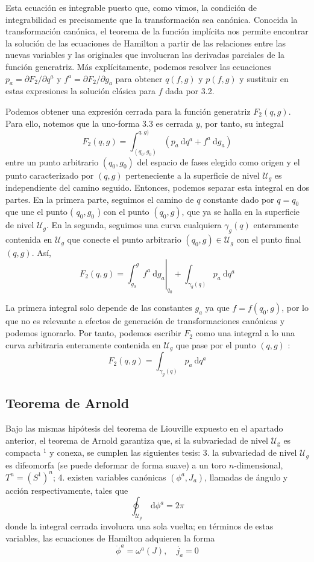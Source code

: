 Esta ecuación es integrable puesto que, como vimos, la condición de integrabilidad es precisamente que la transformación sea canónica. Conocida la transformación canónica, el teorema de la función implícita nos permite encontrar la solución de las ecuaciones de Hamilton a partir de las relaciones entre las nuevas variables y las originales que involucran las derivadas parciales de la función generatriz. Más explícitamente, podemos resolver las ecuaciones $p_{a}=\partial F_{2} / \partial q^{a}$ y $f^{a}=\partial F_{2} / \partial g_{a}$ para obtener $q(f, g)$ y $p(f, g)$ y sustituir en estas expresiones la solución clásica para $f$ dada por 3.2.

Podemos obtener una expresión cerrada para la función generatriz $F_{2}(q, g)$. Para ello, notemos que la uno-forma 3.3 es cerrada $y$, por tanto, su integral
$$
F_{2}(q, g)=\int_{\left(q_{0}, g_{0}\right)}^{q, g)}\left(p_{a} \mathrm{~d} q^{a}+f^{a} \mathrm{~d} g_{a}\right)
$$
entre un punto arbitrario $\left(q_{0}, g_{0}\right)$ del espacio de fases elegido como origen y el punto caracterizado por $(q, g)$ perteneciente a la superficie de nivel $\mathscr{U}_{g}$ es independiente del camino seguido. Entonces, podemos separar esta integral en dos partes. En la primera parte, seguimos el camino de $q$ constante dado por $q=q_{0}$ que une el punto ( $q_{0}, g_{0}$ ) con el punto $\left(q_{0}, g\right)$, que ya se halla en la superficie de nivel $\mathscr{U}_{g}$. En la segunda, seguimos una curva cualquiera $\gamma_{g}(q)$ enteramente contenida en $\mathscr{U}_{g}$ que conecte el punto arbitrario $\left(q_{0}, g\right) \in \mathscr{U}_{g}$ con el punto final $(q, g)$. Así,
$$
F_{2}(q, g)=\left.\int_{g_{0}}^{g} f^{a} \mathrm{~d} g_{a}\right|_{q_{0}}+\int_{\gamma_{g}(q)} p_{a} \mathrm{~d} q^{a}
$$

La primera integral solo depende de las constantes $g_{a}$ ya que $f=f\left(q_{0}, g\right)$, por lo que no es relevante a efectos de generación de transformaciones canónicas y podemos ignorarlo. Por tanto, podemos escribir $F_{2}$ como una integral a lo una curva arbitraria enteramente contenida en $\mathscr{U}_{g}$ que pase por el punto $(q, g)$ :
$$
F_{2}(q, g)=\int_{\gamma_{g}(q)} p_{a} \mathrm{~d} q^{a}
$$
\subsection{Teorema de Arnold}
Bajo las mismas hipótesis del teorema de Liouville expuesto en el apartado anterior, el teorema de Arnold garantiza que, si la subvariedad de nivel $\mathscr{U}_{\mathrm{g}}$ es compacta $^{1}$ y conexa, se cumplen las siguientes tesis:
3. la subvariedad de nivel $\mathscr{U}_{g}$ es difeomorfa (se puede deformar de forma suave) a un toro $n$-dimensional, $T^{n}=\left(S^{1}\right)^{n}$;
4. existen variables canónicas $\left(\phi^{a}, J_{a}\right)$, llamadas de ángulo y acción respectivamente, tales que
$$
\oint_{\mathscr{U}_{g}} \mathrm{~d} \phi^{a}=2 \pi
$$
donde la integral cerrada involucra una sola vuelta; en términos de estas variables, las ecuaciones de Hamilton adquieren la forma
$$
\dot{\phi}^{a}=\omega^{a}(J), \quad \dot{j_{a}}=0
$$

